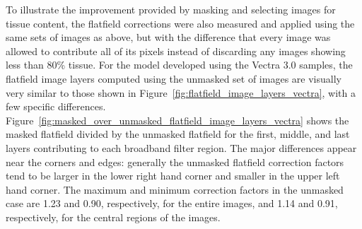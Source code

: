 \documentclass[letterpaper,11pt]{article}
\newcommand{\reffig}[1]{Figure~\ref{#1}}
\begin{document}
To illustrate the improvement provided by masking and selecting images for tissue content, the flatfield corrections were also measured and applied using the same sets of images as above, but with the difference that every image was allowed to contribute all of its pixels instead of discarding any images showing less than 80\% tissue.  For the model developed using the Vectra 3.0 samples, the flatfield image layers computed using the unmasked set of images are visually very similar to those shown in \reffig{fig:flatfield_image_layers_vectra}, with a few specific differences. \reffig{fig:masked_over_unmasked_flatfield_image_layers_vectra} shows the masked flatfield divided by the unmasked flatfield for the first, middle, and last layers contributing to each broadband filter region. The major differences appear near the corners and edges: generally the unmasked flatfield correction factors tend to be larger in the lower right hand corner and smaller in the upper left hand corner. The maximum and minimum correction factors in the unmasked case are 1.23 and 0.90, respectively, for the entire images, and 1.14 and 0.91, respectively, for the central regions of the images.
\end{document}
